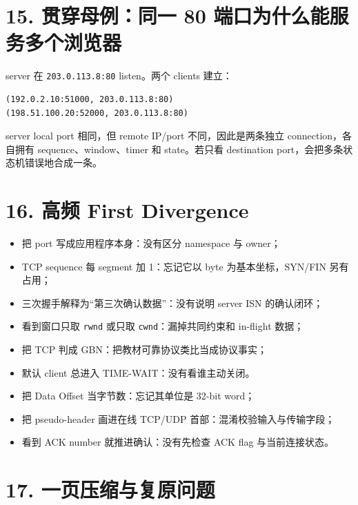 \documentclass[UTF8,fontset=none,11pt,a4paper]{ctexart}
\providecommand{\tightlist}{\setlength{\itemsep}{0pt}\setlength{\parskip}{0pt}}
\providecommand{\passthrough}[1]{#1}
\begin{document}
\section{15. 贯穿母例：同一 80
端口为什么能服务多个浏览器}\label{13-ux8d2fux7a7fux6bcdux4f8bux540cux4e00-80-ux7aefux53e3ux4e3aux4ec0ux4e48ux80fdux670dux52a1ux591aux4e2aux6d4fux89c8ux5668}

server 在 \passthrough{\lstinline!203.0.113.8:80!} listen。两个 clients
建立：

\begin{lstlisting}
(192.0.2.10:51000, 203.0.113.8:80)
(198.51.100.20:52000, 203.0.113.8:80)
\end{lstlisting}

server local port 相同，但 remote IP/port 不同，因此是两条独立
connection，各自拥有 sequence、window、timer 和 state。若只看
destination port，会把多条状态机错误地合成一条。

\section{16. 高频 First
Divergence}\label{14-ux9ad8ux9891-first-divergence}

\begin{itemize}
\tightlist
\item
  把 port 写成应用程序本身：没有区分 namespace 与 owner；
\item
  TCP sequence 每 segment 加 1：忘记它以 byte 为基本坐标，SYN/FIN
  另有占用；
\item
  三次握手解释为``第三次确认数据''：没有说明 server ISN 的确认闭环；
\item
  看到窗口只取 \passthrough{\lstinline!rwnd!} 或只取
  \passthrough{\lstinline!cwnd!}：漏掉共同约束和 in-flight 数据；
\item
  把 TCP 判成 GBN：把教材可靠协议类比当成协议事实；
\item
  默认 client 总进入 TIME-WAIT：没有看谁主动关闭。
\item
  把 Data Offset 当字节数：忘记其单位是 32-bit word；
\item
  把 pseudo-header 画进在线 TCP/UDP 首部：混淆校验输入与传输字段；
\item
  看到 ACK number 就推进确认：没有先检查 ACK flag 与当前连接状态。
\end{itemize}

\section{17.
一页压缩与复原问题}\label{15-ux4e00ux9875ux538bux7f29ux4e0eux590dux539fux95eeux9898}
\end{document}

